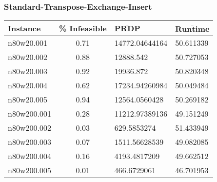 \begin{homeworkProblem}
\subsubsection{Standard-Transpose-Exchange-Insert}
\begin{center}
\begin{tabular}{|l|c|l|l|}
\hline
\textbf{Instance}& \textbf{\% Infeasible} & $\mathbf{\bar{PRDP}}$ &$\mathbf{\bar{Runtime}}$\\
\hline
n80w20.001&0.71&14772.04644164&50.611339\\
\hline
n80w20.002&0.88&12888.542&50.727053\\
\hline
n80w20.003&0.92&19936.872&50.820348\\
\hline
n80w20.004&0.62&17234.94260984&50.049484\\
\hline
n80w20.005&0.94&12564.0560428&50.269182\\
\hline
n80w200.001&0.28&11212.97389136&49.151249\\
\hline
n80w200.002&0.03&629.5853274&51.433949\\
\hline
n80w200.003&0.07&1511.56628539&49.082085\\
\hline
n80w200.004&0.16&4193.4817209&49.662512\\
\hline
n80w200.005&0.01&466.6729061&46.701953\\
\hline
\end{tabular}
\label{tab:s.tei}
\end{center}


\end{homeworkProblem}
